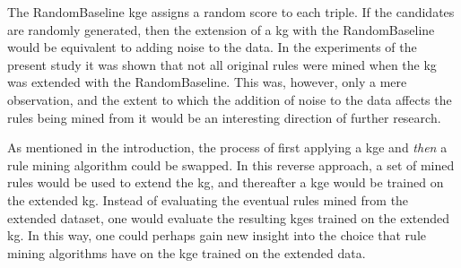 The RandomBaseline \gls{kge} assigns a random score to each triple. If the candidates are randomly generated, then the extension of a \gls{kg} with the RandomBaseline would be equivalent to adding noise to the data. In the experiments of the present study it was shown that not all original rules were mined when the \gls{kg} was extended with the RandomBaseline. This was, however, only a mere observation, and the extent to which the addition of noise to the data affects the rules being mined from it would be an interesting direction of further research.

As mentioned in the introduction, the process of first applying a \gls{kge} and \textit{then} a rule mining algorithm could be swapped. In this reverse approach, a set of mined rules would be used to extend the \gls{kg}, and thereafter a \gls{kge} would be trained on the extended \gls{kg}. Instead of evaluating the eventual rules mined from the extended dataset, one would evaluate the resulting \glspl{kge} trained on the extended \gls{kg}. In this way, one could perhaps gain new insight into the choice that rule mining algorithms have on the \gls{kge} trained on the extended data.